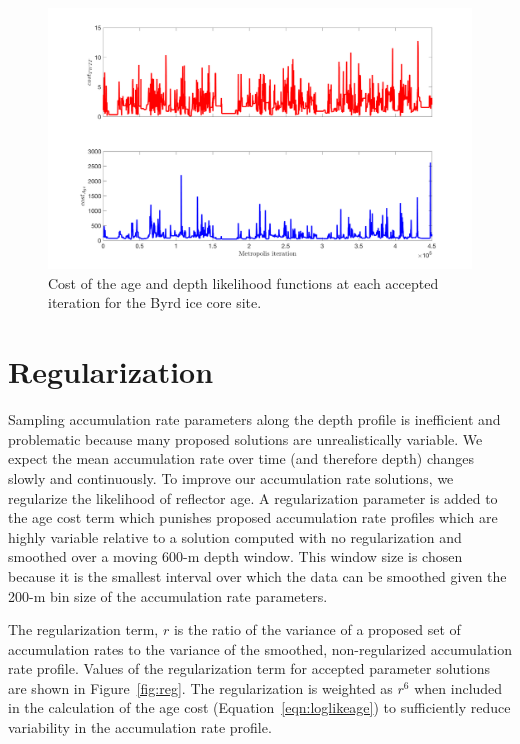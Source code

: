 \begin{figure}[ht]
\centering
\includegraphics[scale=0.4]{../analysis/figures/cost}
\caption[]{Cost of the age and depth likelihood functions at each accepted iteration for the Byrd ice core site.}
\label{fig:cost}
\end{figure}





\section{Regularization}\label{sec:regularization}

Sampling accumulation rate parameters along the depth profile is inefficient and problematic because many proposed solutions are unrealistically variable. We expect the mean accumulation rate over time (and therefore depth) changes slowly and continuously. To improve our accumulation rate solutions, we regularize the likelihood of reflector age. A regularization parameter is added to the age cost term which punishes proposed accumulation rate profiles which are highly variable relative to a solution computed with no regularization and smoothed over a moving 600-m depth window. This window size is chosen because it is the smallest interval over which the data can be smoothed given the 200-m bin size of the accumulation rate parameters. 

The regularization term, $r$ is the ratio of the variance of a proposed set of accumulation rates to the variance of the smoothed, non-regularized accumulation rate profile. Values of the regularization term for accepted parameter solutions are shown in Figure~\ref{fig:reg}. The regularization is weighted as $r^6$ when included in the calculation of the age cost (Equation~\ref{eqn:loglikeage}) to sufficiently reduce variability in the accumulation rate profile. 


